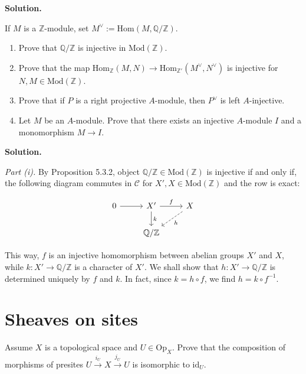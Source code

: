 \documentclass{category-template}
\begin{document}
\textbf{Solution.} 

\begin{problem}
    If $M$ is a $\mathbb{Z}$-module, set $M^{\vee} :=
    \text{Hom}(M,\mathbb{Q}/\mathbb{Z})$.
    \begin{enumerate}
        \item Prove that $\mathbb{Q}/\mathbb{Z}$ is injective in $\text{Mod}(\mathbb{Z})$.
        \item Prove that the map $\text{Hom}_{\mathbb{Z}}(M,N) \to \text{Hom}_{\mathbb{Z}'}(M^{\vee},N^{\vee})$ is injective 
        for $N,M \in \text{Mod}(\mathbb{Z})$.
        \item Prove that if $P$ is a right projective $A$-module, then $P^{\vee}$ is left $A$-injective.
        \item Let $M$ be an $A$-module. Prove that there exists an injective $A$-module 
        $I$ and a monomorphism $M \to I$.
    \end{enumerate}
\end{problem}

\textbf{Solution.}

\textit{Part (i).} By Proposition 5.3.2, object $\mathbb{Q}/\mathbb{Z} \in
\text{Mod}(\mathbb{Z})$ is injective if and only if, the following diagram
commutes in $\mathcal{C}$ for $X',X \in \text{Mod}(\mathbb{Z})$ and the row 
is exact:

\[
\begin{tikzcd}
	{0} \arrow{r}{} & {X'} \arrow{d}{k} \arrow{r}{f} & X \arrow[dashrightarrow]{ld}{h} \\
	{} & {\mathbb{Q}/\mathbb{Z}}
\end{tikzcd}
\]

This way, $f$ is an injective homomorphism between abelian groups $X'$ and $X$,
while $k: X' \to \mathbb{Q}/\mathbb{Z}$ is a character of $X'$. We shall show
that $h: X' \to \mathbb{Q}/\mathbb{Z}$ is determined uniquely by $f$ and $k$.
In fact, since $k = h \circ f$, we find $h = k \circ f^{-1}$. 

\newpage

\section{Sheaves on sites}

\begin{problem}[Exercise 1.3]
    Assume $X$ is a topological space and $U \in \text{Op}_X$. Prove that the
    composition of morphisms of presites $U \xrightarrow{i_U} X
    \xrightarrow{j_U}U$ is isomorphic to $\text{id}_U$. 
\end{problem}
\end{document}
